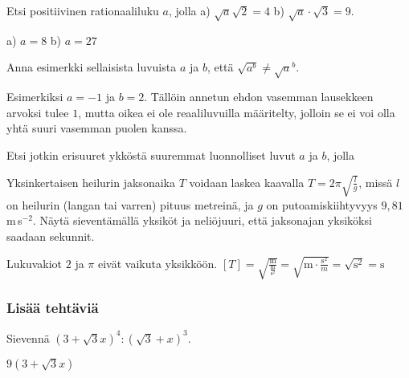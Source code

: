 \begin{tehtavasivu}
\begin{tehtava} Etsi positiivinen rationaaliluku $a$, jolla
a) $\sqrt{a} \sqrt{2} = 4$  \quad b)   $ \sqrt{a}\cdot{\sqrt{3}} =9 $.   \quad 
\begin{vastaus}
a) $a=8$ \quad b) $a=27$ \quad 
\end{vastaus}
\end{tehtava}

\begin{tehtava}
Anna esimerkki sellaisista luvuista $a$ ja $b$, että $\sqrt{a^b}\neq {\sqrt{a}}^b$.
	\begin{vastaus}
	Esimerkiksi $a=-1$ ja $b=2$. Tällöin annetun ehdon vasemman lausekkeen arvoksi tulee $1$, mutta oikea ei ole reaaliluvuilla määritelty, jolloin se ei voi olla yhtä suuri vasemman puolen kanssa.
	\end{vastaus}
\end{tehtava}

\begin{tehtava} Etsi jotkin erisuuret ykköstä suuremmat luonnolliset luvut $a$ ja $b$, jolla
\begin{vastaus}
\end{vastaus}
\end{tehtava}

\begin{tehtava}
Yksinkertaisen heilurin jaksonaika $T$ voidaan laskea kaavalla $T=2\pi\sqrt{\frac{l}{g}}$, missä $l$ on heilurin (langan tai varren) pituus metreinä, ja $g$ on putoamiskiihtyvyys $9,81\,$m\,s$^{-2}$. Näytä sieventämällä yksiköt ja neliöjuuri, että jaksonajan yksiköksi saadaan sekunnit.
	\begin{vastaus}
	Lukuvakiot $2$ ja $\pi$ eivät vaikuta yksikköön. $[T]=\sqrt{\frac{\text{m}}{\frac{\text{m}}{\text{s}^2}}}=\sqrt{\text{m}\cdot \frac{\text{s}^2}{m}}=\sqrt{\text{s}^2}=\text{s}$
	\end{vastaus} 
\end{tehtava}

\subsubsection*{Lisää tehtäviä}

\begin{tehtava}
Sievennä $(3+\sqrt{3}x)^4:(\sqrt{3}+x)^3$.
\begin{vastaus}
$9(3 + \sqrt{3}x)$
\end{vastaus}
\end{tehtava}


\end{tehtavasivu}
